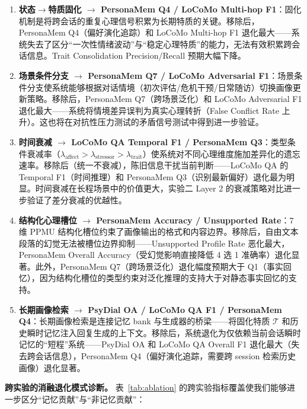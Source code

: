 \documentclass[12pt,a4paper]{article}
\begin{document}
\begin{enumerate}
  \item \textbf{状态$\to$特质固化 $\to$ PersonaMem Q4 / LoCoMo Multi-hop F1}：固化机制是将跨会话的重复心理信号积累为长期特质的关键。移除后，PersonaMem Q4（偏好演化追踪）和 LoCoMo Multi-hop F1 退化最大——系统失去了区分``一次性情绪波动''与``稳定心理特质''的能力，无法有效积累跨会话信息。Trait Consolidation Precision/Recall 预期大幅下降。

  \item \textbf{场景条件分支 $\to$ PersonaMem Q7 / LoCoMo Adversarial F1}：场景条件分支使系统能够根据对话情境（初次评估/危机干预/日常随访）切换画像更新策略。移除后，PersonaMem Q7（跨场景泛化）和 LoCoMo Adversarial F1 退化最大——系统将情境差异误判为真实心理转折（False Conflict Rate 上升）。这也将在对抗性压力测试的矛盾信号测试中得到进一步验证。

  \item \textbf{时间衰减 $\to$ LoCoMo QA Temporal F1 / PersonaMem Q3}：类型条件衰减率（$\lambda_{\text{affect}} > \lambda_{\text{stressor}} > \lambda_{\text{trait}}$）使系统对不同心理维度施加差异化的遗忘速率。移除后（统一不衰减），陈旧信息干扰当前判断——LoCoMo QA 的 Temporal F1（时间推理）和 PersonaMem Q3（识别最新偏好）退化最为明显。时间衰减在长程场景中的价值更大，实验二 Layer 2 的衰减策略对比进一步验证了差分衰减的优越性。

  \item \textbf{结构化心理槽位 $\to$ PersonaMem Accuracy / Unsupported Rate}：7 维 PPMU 结构化槽位约束了画像输出的格式和内容边界。移除后，自由文本段落的幻觉无法被槽位边界抑制——Unsupported Profile Rate 恶化最大，PersonaMem Overall Accuracy（受幻觉影响直接降低 4 选 1 准确率）退化显著。此外，PersonaMem Q7（跨场景泛化）退化幅度预期大于 Q1（事实回忆），因为结构化槽位的类型约束对泛化推理的支持大于对静态事实回忆的支持。

  \item \textbf{长期画像检索 $\to$ PsyDial OA / LoCoMo QA F1 / PersonaMem Q4}：长期画像检索是连接记忆 bank 与生成器的桥梁——将固化特质 $\mathcal{T}$ 和历史瞬时记忆注入回复生成的上下文。移除后，系统退化为仅依赖当前会话瞬时记忆的``短程''系统——PsyDial OA 和 LoCoMo QA Overall F1 退化最大（失去跨会话信息），PersonaMem Q4（偏好演化追踪，需要跨 session 检索历史画像）退化显著。
\end{enumerate}

\textbf{跨实验的消融退化模式诊断。} 表~\ref{tab:ablation} 的跨实验指标覆盖使我们能够进一步区分``记忆贡献''与``非记忆贡献''：
\end{document}
